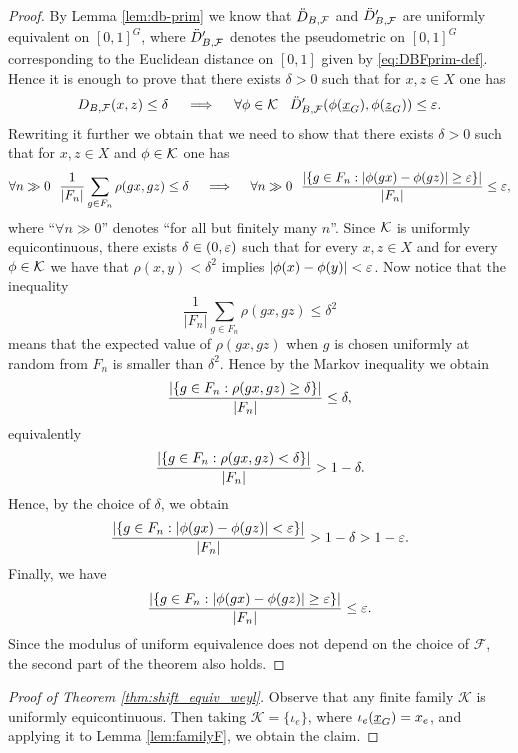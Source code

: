 \begin{proof}
By Lemma \ref{lem:db-prim} we know that $\ddot D_{B,\operatorname{\mathcal{F}}}$ and $\ddot D_{B,\operatorname{\mathcal{F}}}'$ are uniformly equivalent on $[0,1]^G$, where $\ddot{D}_{B,\operatorname{\mathcal{F}}}'$ denotes the pseudometric on $[0,1]^G$ corresponding to the Euclidean distance on $[0,1]$ given by \eqref{eq:DBFprim-def}. 
%
Hence it is enough to prove that there exists $\delta>0$ such that for $x,z\in X$ one has
\[
D_{B,\operatorname{\mathcal{F}}}(x,z)\leq\delta \quad \implies \quad \forall \phi\in\operatorname{\mathcal{K}}~~ \ddot D'_{B,\operatorname{\mathcal{F}}}(\phi(\underline{x}_G),\phi(\underline{z}_G))\leq\varepsilon.
\]
Rewriting it further we obtain that we need to show that there exists $\delta>0$ such that for $x,z\in X$ and $\phi\in\operatorname{\mathcal{K}}$ one has
\[
\forall n\gg0 ~~\frac{1}{|F_n|}\sum_{g\in F_n}\rho(gx,gz)\leq\delta\quad\implies\quad \forall n\gg0 ~~\frac{ \left|\left\{g\in F_n: |\phi(gx)-\phi(gz)|\geq\varepsilon \right\}\right|}{|F_n|}\leq\varepsilon,
\]
where ``$\forall n\gg0$'' denotes ``for all but finitely many $n$''.
Since $\operatorname{\mathcal{K}}$ is uniformly equicontinuous, there exists $\delta\in(0,\varepsilon)$ such that for every $x,z\in X$ and for every $\phi\in\operatorname{\mathcal{K}}$ we have that $\rho(x,y)<\delta^2$ implies $|\phi(x)-\phi(y)|<\varepsilon$. Now notice that the inequality
\begin{equation}\label{eq:exp_val}
\frac{1}{|F_n|}\sum_{g\in F_n}\rho(gx,gz)\leq\delta^2
\end{equation}
means that the expected value of $\rho(gx,gz)$ when $g$ is chosen uniformly at random from $F_n$ is smaller than $\delta^2$. Hence by the Markov inequality we obtain
\[
\frac{ \left|\left\{g\in F_n:\rho(gx,gz)\geq\delta \right\}\right|}{|F_n|}\leq\delta,
\]
equivalently 
\[
\frac{ \left|\left\{g\in F_n: \rho(gx,gz)<\delta \right\}\right|}{|F_n|}>1-\delta.
\]
Hence, by the choice of $\delta$, we obtain
\[
\frac{ \left|\left\{g\in F_n: |\phi(gx)-\phi(gz)|<\varepsilon\right\}\right|}{|F_n|}> 1-\delta>1-\varepsilon.
\]
Finally, we have
\[
\frac{ \left|\left\{g\in F_n: |\phi(gx)-\phi(gz)|\geq\varepsilon\right\}\right|}{|F_n|}\leq\varepsilon.
\]
Since the modulus of uniform equivalence does not depend on the choice of $\mathcal F$, the second part of the theorem also holds.
\end{proof}

\indent


\begin{proof}[Proof of Theorem \ref{thm:shift_equiv_weyl}]
Observe that any finite family $\mathcal{K}$ is uniformly equicontinuous.
Then taking $\mathcal{K}=\{\iota_e\}$, where $\iota_e(\underline{x}_G)=x_e$, and applying it to Lemma \ref{lem:familyF}, we obtain the claim.
\end{proof}
